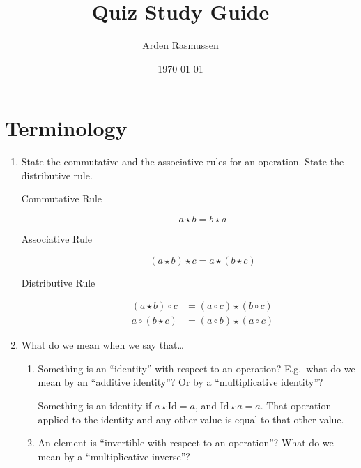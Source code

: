 \documentclass[10pt]{amsart}
\title{Quiz Study Guide}
\author{Arden Rasmussen}
\date{\today}
\begin{document}
\maketitle

\section{Terminology}%
\label{sec:terminology}

\begin{enumerate}
  \item State the commutative and the associative rules for an operation. State
    the distributive rule.
    \begin{description}
      \item[Commutative Rule] \[a\star b=b\star a\]
      \item[Associative Rule] \[( a \star b)\star c =
        a\star(b\star c)\]
      \item[Distributive Rule]
        \begin{align*}
          (a\star b)\circ c&= (a\circ c)\star(b \circ c)\\
          a\circ(b\star c)&=(a\circ b)\star(a\circ c)
        \end{align*}
    \end{description}
  \item What do we mean when we say that\ldots
    \begin{enumerate}[listparindent=0.7cm]
      \item Something is an ``identity'' with respect to an operation? E.g.\ what
        do we mean by an ``additive identity''? Or by a ``multiplicative
        identity''?

        Something is an identity if $a\star \text{Id}=a$, and
        $\text{Id}\star a=a$. That operation applied to the identity and any
        other value is equal to that other value.
      \item An element is ``invertible with respect to an operation''? What do we
        mean by a ``multiplicative inverse''?


\end{enumerate}
\end{enumerate}
\end{document}
